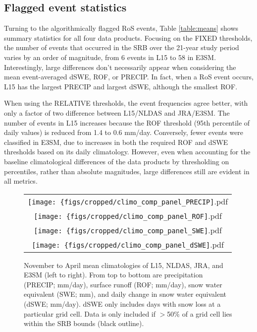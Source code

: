 \documentclass[draft]{agujournal2019}
\begin{document}
\subsection{Flagged event statistics}

Turning to the algorithmically flagged RoS events, Table \ref{table:means} shows summary statistics for all four data products. 
Focusing on the FIXED thresholds, the number of events that occurred in the SRB over the 21-year study period varies by an order of magnitude, from 6 events in L15 to 58 in E3SM.
Interestingly, large differences don't necessarily appear when considering the mean event-averaged dSWE, ROF, or PRECIP. 
In fact, when a RoS event occurs, L15 has the largest PRECIP and largest dSWE, although the smallest ROF.

When using the RELATIVE thresholds, the event frequencies agree better, with only a factor of two difference between L15/NLDAS and JRA/E3SM. 
The number of events in L15 increases because the ROF threshold (95th percentile of daily values) is reduced from 1.4 to 0.6 mm/day. 
Conversely, fewer events were classified in E3SM, due to increases in both the required ROF and dSWE thresholds based on its daily climatology. 
However, even when accounting for the baseline climatological differences of the data products by thresholding on percentiles, rather than absolute magnitudes, large differences still are evident in all metrics.

\begin{figure}
\begin{tabular}{c}
\texttt{[image: \{figs/cropped/climo\_comp\_panel\_PRECIP]}.pdf} \\
\texttt{[image: \{figs/cropped/climo\_comp\_panel\_ROF]}.pdf} \\
\texttt{[image: \{figs/cropped/climo\_comp\_panel\_SWE]}.pdf} \\
\texttt{[image: \{figs/cropped/climo\_comp\_panel\_dSWE]}.pdf}
\end{tabular}
\caption{November to April mean climatologies of L15, NLDAS, JRA, and E3SM (left to right). From top to bottom are precipitation (PRECIP; mm/day), surface runoff (ROF; mm/day), snow water equivalent (SWE; mm), and daily change in snow water equivalent (dSWE; mm/day). dSWE only includes days with snow loss at a particular grid cell. Data is only included if $>$50\% of a grid cell lies within the SRB bounds (black outline).}
\label{fig:means}
\end{figure}
\end{document}
